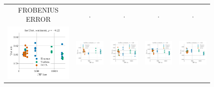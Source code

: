 \begin{figure}
\begin{tabular}{@{\hskip -0.0in}c@{\hskip -0.0in}c@{\hskip -0.0in}c@{\hskip -0.0in}c@{\hskip -0.0in}c@{\hskip -0.0in}}
		
		FROBENIUS ERROR & . & . & . & .\\
		\includegraphics[width=.2\linewidth]{figures/fasttext1m_sentiment_mr_test-acc_vs_gram-large-dim-frob-error_linx.pdf} &
		\includegraphics[width=.2\linewidth]{figures/fasttext1m_sentiment_subj_test-acc_vs_gram-large-dim-frob-error_linx.pdf} &
		\includegraphics[width=.2\linewidth]{figures/fasttext1m_sentiment_cr_test-acc_vs_gram-large-dim-frob-error_linx.pdf} &
		\includegraphics[width=.2\linewidth]{figures/fasttext1m_sentiment_sst_test-acc_vs_gram-large-dim-frob-error_linx.pdf} &
		\includegraphics[width=.2\linewidth]{figures/fasttext1m_sentiment_mpqa_test-acc_vs_gram-large-dim-frob-error_linx.pdf} \\
		

\end{tabular}
\end{figure}

